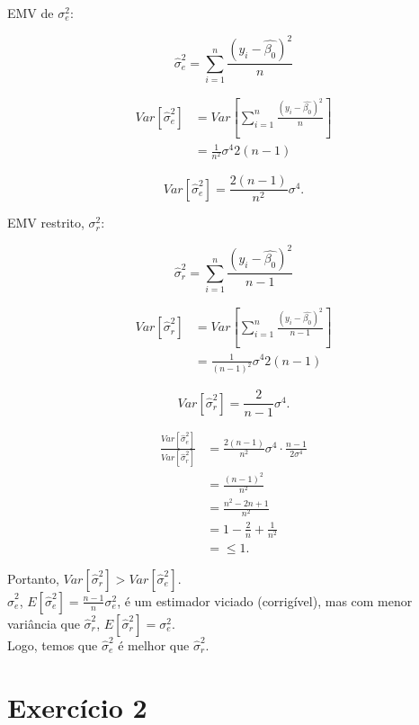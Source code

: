 \documentclass[12pt, oldfontcommands]{article}\usepackage[]{graphicx}\usepackage[]{color}
\begin{document}
\begin{multicols}{2}
EMV de \(\sigma_{e}^{2}\):

\[ \hat{\sigma}_{e}^{2} =
   \sum_{i = 1}^{n} \frac{(y_{i} - \hat{\beta_{0}})^{2}}{n} \]

\begin{align*}
 Var[\hat{\sigma}_{e}^{2}] & =
 Var[\sum_{i = 1}^{n} \frac{(y_{i} - \hat{\beta_{0}})^{2}}{n}] \\ & =
 \frac{1}{n^{2}} \sigma^{4} 2 (n - 1)
\end{align*}

\[ \boxed{Var[\hat{\sigma}_{e}^{2}] =
          \frac{2 (n - 1)}{n^{2}} \sigma^{4}.} \]

EMV restrito, \(\sigma_{r}^{2}\):

\[ \hat{\sigma}_{r}^{2} =
   \sum_{i = 1}^{n} \frac{(y_{i} - \hat{\beta_{0}})^{2}}{n - 1} \]

\begin{align*}
 Var[\hat{\sigma}_{r}^{2}] & =
 Var[\sum_{i = 1}^{n} \frac{(y_{i} - \hat{\beta_{0}})^{2}}{n - 1}] \\
 & = \frac{1}{(n - 1)^{2}} \sigma^{4} 2 (n - 1)
\end{align*}

\[ \boxed{Var[\hat{\sigma}_{r}^{2}] = \frac{2}{n - 1} \sigma^{4}.} \]
\end{multicols}

\begin{align*}
 \frac{Var[\hat{\sigma}_{e}^{2}]}{Var[\hat{\sigma}_{r}^{2}]} & =
 \frac{2 (n - 1)}{n^{2}} \sigma^{4} \cdot \frac{n - 1}{2 \sigma^{4}} \\
 & = \frac{(n - 1)^{2}}{n^{2}} \\ & = \frac{n^{2} - 2n + 1}{n^{2}} \\
 & = 1 - \frac{2}{n} + \frac{1}{n^{2}} \\ & = \leq 1.
\end{align*}

Portanto,
\(\boxed{Var[\hat{\sigma}_{r}^{2}] > Var[\hat{\sigma}_{e}^{2}]}\). \\

\(\hat{\sigma}_{e}^{2}\),
\(E[\hat{\sigma}_{e}^{2}] = \frac{n - 1}{n} \sigma_{e}^{2}\), é um
estimador viciado (corrigível), mas com menor variância que
\(\hat{\sigma}_{r}^{2}\), \(E[\hat{\sigma}_{r}^{2}] = \sigma_{e}^{2}\).
\\

Logo, temos que
\(\hat{\sigma}_{e}^{2}\) é melhor que \(\hat{\sigma}_{r}^{2}\).

\section*{Exercício 2} 
\end{document}
